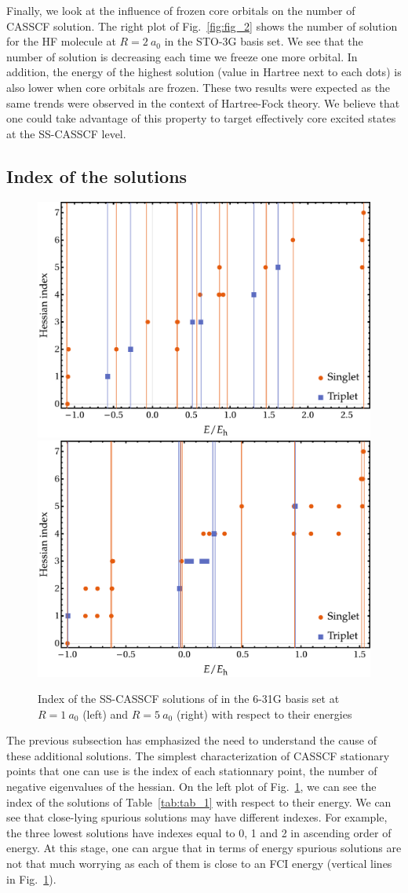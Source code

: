 \documentclass[aps,prb,reprint,showkeys,superscriptaddress]{revtex4-1}
\begin{document}
Finally, we look at the influence of frozen core orbitals on the number of CASSCF solution.
The right plot of Fig.~\ref{fig:fig_2} shows the number of solution for the HF molecule at $R=2~a_0$ in the STO-3G basis set.
We see that the number of solution is decreasing each time we freeze one more orbital.
In addition, the energy of the highest solution (value in Hartree next to each dots) is also lower when core orbitals are frozen.
These two results were expected as the same trends were observed in the context of Hartree-Fock theory. \cite{Dong_2020}
We believe that one could take advantage of this property to target effectively core excited states at the SS-CASSCF level.

\subsection{Index of the solutions}
\label{sec:geom}

\begin{figure}
  \includegraphics[width=0.4\linewidth]{Figures/fig_3a.pdf}
  \hspace{0.05\linewidth}
  \includegraphics[width=0.4\linewidth]{Figures/fig_3b.pdf}
  \caption{Index of the SS-CASSCF solutions of  in the 6-31G basis set at $R=1~a_0$ (left) and $R=5~a_0$ (right) with respect to their energies
    \label{fig:fig_3}}
\end{figure}

The previous subsection has emphasized the need to understand the cause of these additional solutions.
The simplest characterization of CASSCF stationary points that one can use is the index of each stationnary point, \ie the number of negative eigenvalues of the hessian.
On the left plot of Fig.~\ref{fig:fig_3}, we can see the index of the solutions of Table~\ref{tab:tab_1} with respect to their energy.
We can see that close-lying spurious solutions may have different indexes.
For example, the three lowest solutions have indexes equal to 0, 1 and 2 in ascending order of energy.
At this stage, one can argue that in terms of energy spurious solutions are not that much worrying as each of them is close to an FCI energy (vertical lines in  Fig.~\ref{fig:fig_3}).
\end{document}
